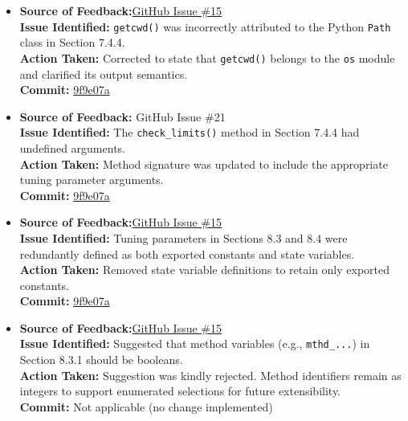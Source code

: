 \documentclass{article}
\begin{document}
\begin{itemize}
  \item \textbf{Source of Feedback:}\href{https://github.com/KiranSingh15/CAS-741-Image-Correspondences/issues/15}{GitHub Issue \#15} \\
  \textbf{Issue Identified:} \texttt{getcwd()} was incorrectly attributed to the Python \texttt{Path} class in Section 7.4.4. \\
  \textbf{Action Taken:} Corrected to state that \texttt{getcwd()} belongs to the \texttt{os} module and clarified its output semantics. \\
  \textbf{Commit:} \href{https://github.com/KiranSingh15/CAS-741-Image-Correspondences/commit/9f9e07a572e2f0db97f3e057f998ba9bad0d9189}{9f9e07a}

  \item \textbf{Source of Feedback:} GitHub Issue \#21 \\
  \textbf{Issue Identified:} The \texttt{check\_limits()} method in Section 7.4.4 had undefined arguments. \\
  \textbf{Action Taken:} Method signature was updated to include the appropriate tuning parameter arguments. \\
  \textbf{Commit:} \href{https://github.com/KiranSingh15/CAS-741-Image-Correspondences/commit/9f9e07a572e2f0db97f3e057f998ba9bad0d9189}{9f9e07a}

  \item \textbf{Source of Feedback:}\href{https://github.com/KiranSingh15/CAS-741-Image-Correspondences/issues/15}{GitHub Issue \#15} \\
  \textbf{Issue Identified:} Tuning parameters in Sections 8.3 and 8.4 were redundantly defined as both exported constants and state variables. \\
  \textbf{Action Taken:} Removed state variable definitions to retain only exported constants. \\
  \textbf{Commit:} \href{https://github.com/KiranSingh15/CAS-741-Image-Correspondences/commit/9f9e07a572e2f0db97f3e057f998ba9bad0d9189}{9f9e07a}

  \item \textbf{Source of Feedback:}\href{https://github.com/KiranSingh15/CAS-741-Image-Correspondences/issues/15}{GitHub Issue \#15} \\
  \textbf{Issue Identified:} Suggested that method variables (e.g., \texttt{mthd\_...}) in Section 8.3.1 should be booleans. \\
  \textbf{Action Taken:} Suggestion was kindly rejected. Method identifiers remain as integers to support enumerated selections for future extensibility. \\
  \textbf{Commit:} Not applicable (no change implemented)


\end{itemize}
\end{document}
